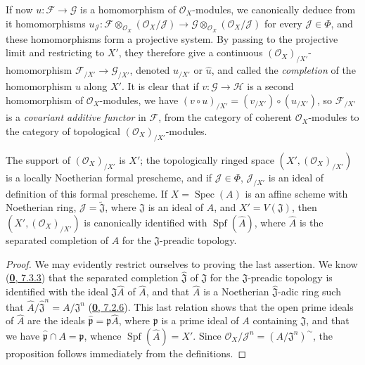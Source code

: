 If now $u:\mathscr{F}\to\mathscr{G}$ is a homomorphism of
$\mathscr{O}_X$-modules, we canonically deduce from it homomorphisms
$u_{\mathscr{J}}:
\mathscr{F}\otimes_{\mathscr{O}_X}(\mathscr{O}_X/\mathscr{J})
\to
\mathscr{G}\otimes_{\mathscr{O}_X}(\mathscr{O}_X/\mathscr{J})$
for every $\mathscr{J}\in\Phi$, and these homomorphisms form a
projective system. By passing to the projective limit and restricting
to $X'$, they therefore give a continuous
$(\mathscr{O}_X)_{/X'}$-homomorphism
$\mathscr{F}_{/X'}\to\mathscr{G}_{/X'}$, denoted $u_{/X'}$ or $\widehat u$,
and called the \emph{completion} of the homomorphism $u$ along $X'$. It
is clear that if $v:\mathscr{G}\to\mathscr{H}$ is a second homomorphism
of $\mathscr{O}_X$-modules, we have
$(v\circ u)_{/X'}=(v_{/X'})\circ(u_{/X'})$, so
$\mathscr{F}_{/X'}$ is a \emph{covariant additive functor} in
$\mathscr{F}$, from the category of coherent $\mathscr{O}_X$-modules to
the category of topological $(\mathscr{O}_X)_{/X'}$-modules.

\begin{proposition}[10.8.5]
\label{I.10.8.5}
The support of $(\mathscr{O}_X)_{/X'}$ is $X'$; the topologically
ringed space $(X',(\mathscr{O}_X)_{/X'})$ is a locally Noetherian
formal prescheme, and if $\mathscr{J}\in\Phi$, $\mathscr{J}_{/X'}$ is an
ideal of definition of this formal prescheme. If
$X=\operatorname{Spec}(A)$ is an affine scheme with Noetherian ring,
$\mathscr{J}=\widetilde{\mathfrak{J}}$, where $\mathfrak{J}$ is an ideal
of $A$, and $X'=V(\mathfrak{J})$, then
$(X',(\mathscr{O}_X)_{/X'})$ is canonically identified with
$\operatorname{Spf}(\widehat A)$, where $\widehat A$ is the separated
completion of $A$ for the $\mathfrak{J}$-preadic topology.
\end{proposition}

\begin{proof}
We may evidently restrict ourselves to proving the last assertion. We
know (\hyperref[0.7.3.3]{\textbf{0}, 7.3.3}) that the separated completion
$\widehat{\mathfrak{J}}$ of $\mathfrak{J}$ for the
$\mathfrak{J}$-preadic topology is identified with the ideal
$\mathfrak{J}\widehat A$ of $\widehat A$, and that $\widehat A$ is a
Noetherian $\widehat{\mathfrak{J}}$-adic ring such that
$\widehat A/\widehat{\mathfrak{J}}^n=A/\mathfrak{J}^n$
(\hyperref[0.7.2.6]{\textbf{0}, 7.2.6}). This last relation shows that the
open prime ideals of $\widehat A$ are the ideals
$\widehat{\mathfrak p}=\mathfrak p\widehat A$, where $\mathfrak p$ is a
prime ideal of $A$ containing $\mathfrak{J}$, and that we have
$\widehat{\mathfrak p}\cap A=\mathfrak p$, whence
$\operatorname{Spf}(\widehat A)=X'$. Since
$\mathscr{O}_X/\mathscr{J}^n=(A/\mathfrak{J}^n)^{\sim}$, the proposition
follows immediately from the definitions.
\end{proof}

